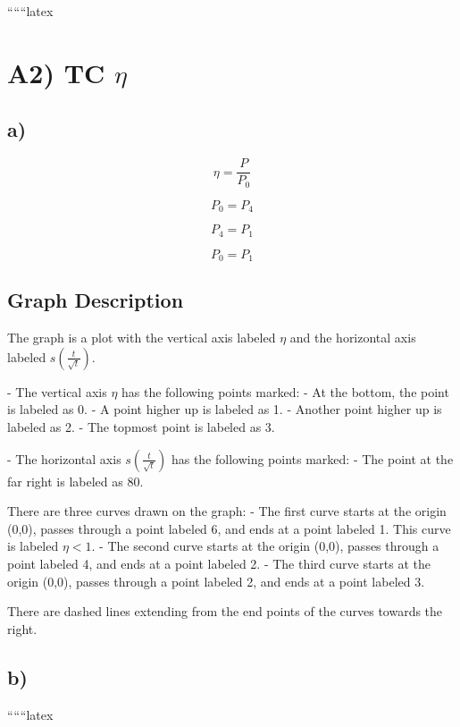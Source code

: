 
``````latex


\section*{A2) TC $\eta$}

\subsection*{a)}

\[
\eta = \frac{P}{P_0}
\]

\[
P_0 = P_4
\]

\[
P_4 = P_1
\]

\[
P_0 = P_1
\]

\subsection*{Graph Description}

The graph is a plot with the vertical axis labeled $\eta$ and the horizontal axis labeled $s \left( \frac{t}{\sqrt{t}} \right)$. 

- The vertical axis $\eta$ has the following points marked:
  - At the bottom, the point is labeled as 0.
  - A point higher up is labeled as 1.
  - Another point higher up is labeled as 2.
  - The topmost point is labeled as 3.

- The horizontal axis $s \left( \frac{t}{\sqrt{t}} \right)$ has the following points marked:
  - The point at the far right is labeled as 80.

There are three curves drawn on the graph:
- The first curve starts at the origin (0,0), passes through a point labeled 6, and ends at a point labeled 1. This curve is labeled $\eta < 1$.
- The second curve starts at the origin (0,0), passes through a point labeled 4, and ends at a point labeled 2.
- The third curve starts at the origin (0,0), passes through a point labeled 2, and ends at a point labeled 3.

There are dashed lines extending from the end points of the curves towards the right.

\subsection*{b)}

``````latex


